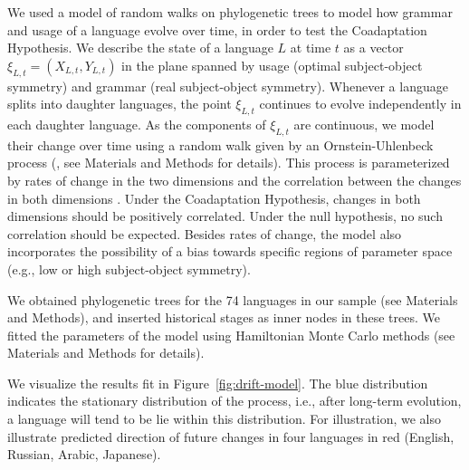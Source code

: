 \documentclass[11pt,a4paper]{article}
\begin{document}
We used a model of random walks on phylogenetic trees \citep{felsenstein1973maximum,pagel1997inferring, pagel2004bayesian} to model how grammar and usage of a language evolve over time, in order to test the Coadaptation Hypothesis.
We describe the state of a language $L$ at time $t$ as a vector $\xi_{L,t} = (X_{L,t}, Y_{L,t})$ in the plane spanned by usage (optimal subject-object symmetry) and grammar (real subject-object symmetry).
Whenever a language splits into daughter languages, the point $\xi_{L,t}$ continues to evolve independently in each daughter language.
As the components of $\xi_{L,t}$ are continuous, we model their change over time using a random walk given by an Ornstein-Uhlenbeck process (\citep{blackwell2003bayesian}, see Materials and Methods for details).
This process is parameterized by rates of change in the two dimensions and the correlation between the changes in both dimensions \citep{felsenstein1973maximum,freckleton2012fast}.
Under the Coadaptation Hypothesis, changes in both dimensions should be positively correlated.
Under the null hypothesis, no such correlation should be expected.
Besides rates of change, the model also incorporates the possibility of a bias towards specific regions of parameter space (e.g., low or high subject-object symmetry).

We obtained phylogenetic trees for the 74 languages in our sample (see Materials and Methods), and inserted historical stages as inner nodes in these trees.
We fitted the parameters of the model using Hamiltonian Monte Carlo methods (see Materials and Methods for details).







We visualize the results fit in Figure~\ref{fig:drift-model}.
The blue distribution indicates the stationary distribution of the process, i.e., after long-term evolution, a language will tend to be lie within this distribution.
For illustration, we also illustrate predicted direction of future changes in four languages in red (English, Russian, Arabic, Japanese).
\end{document}
